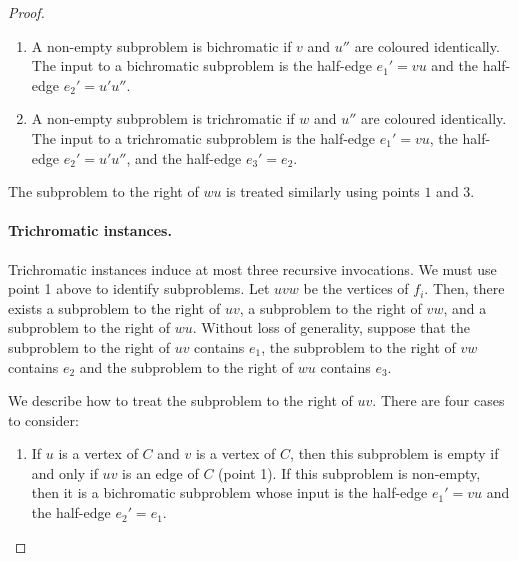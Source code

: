 \documentclass{patmorin}
\begin{document}
\begin{proof}
\begin{enumerate}
\begin{enumerate}
  \item A non-empty subproblem is bichromatic if $v$ and $u''$ are coloured identically. The input to a bichromatic subproblem is the half-edge $e_1'=vu$ and the half-edge $e_2'=u'u''$.
  
  \item A non-empty subproblem is trichromatic if $w$ and $u''$ are coloured identically. The input to a trichromatic subproblem is the half-edge $e_1'=vu$, the half-edge $e_2'=u'u''$, and the half-edge $e_3'=e_2$.
\end{enumerate}
\end{enumerate}
The subproblem to the right of $wu$ is treated similarly using points $1$ and $3$.

\paragraph{Trichromatic instances.} %
Trichromatic instances induce at most three recursive invocations. We must use point 1 above to identify subproblems. Let $uvw$ be the vertices of $f_i$. Then, there exists a subproblem to the right of $uv$, a subproblem to the right of $vw$, and a subproblem to the right of $wu$.  Without loss of generality, suppose that the subproblem to the right of $uv$ contains $e_1$, the subproblem to the right of $vw$ contains $e_2$ and the subproblem to the right of $wu$ contains $e_3$.

We describe how to treat the subproblem to the right of $uv$. There are four cases to consider:
\begin{enumerate}
  \item If $u$ is a vertex of $C$ and $v$ is a vertex of $C$, then this subproblem is empty if and only if $uv$ is an edge of $C$ (point 1). If this subproblem is non-empty, then it is a bichromatic subproblem whose input is the half-edge $e_1'=vu$ and the half-edge $e_2'=e_1$.



\end{enumerate}
\end{proof}
\end{document}
